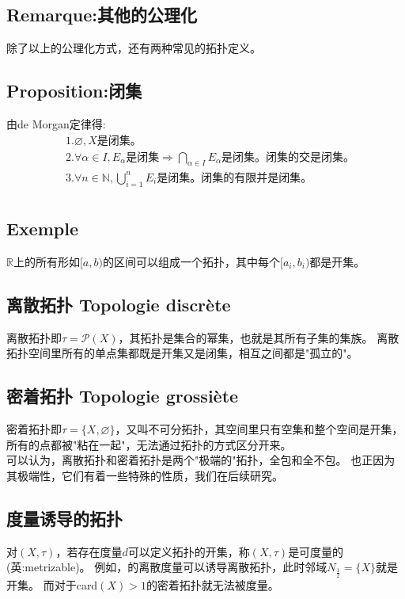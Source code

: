 \documentclass[12pt, a4paper, oneside]{ctexbook}
\begin{document}
  \subsection{Remarque:其他的公理化}
  除了以上的公理化方式，还有两种常见的拓扑定义。
  \subsection{Proposition:闭集}
  由de Morgan定律得:
  $$
  \begin{aligned}&
  1.\varnothing, X{ 是闭集。}\\&
  2.\forall\alpha\in I,E_\alpha\text{是闭集} \Rightarrow\bigcap_{\alpha\in I}E_\alpha \text{是闭集。闭集的交是闭集。}\\&
  3.\forall n\in\mathbb{N},\bigcup_{i=1}^{n}E_i \text{是闭集。闭集的有限并是闭集。}\\
    \end{aligned}
  $$
  \subsection{Exemple}
  $\mathbb{R}$上的所有形如$[a,b)$的区间可以组成一个拓扑，其中每个$[a_i,b_i)$都是开集。

  \subsection{离散拓扑 Topologie discrète}
  离散拓扑即$\tau=\mathcal{P} (X)$，其拓扑是集合的幂集，也就是其所有子集的集族。
  离散拓扑空间里所有的单点集都既是开集又是闭集，相互之间都是"孤立的"。

  \subsection{密着拓扑 Topologie grossiète}
  密着拓扑即$\tau=\{X,\varnothing \}$，又叫不可分拓扑，其空间里只有空集和整个空间是开集，所有的点都被"粘在一起"，无法通过拓扑的方式区分开来。\\
  
  可以认为，离散拓扑和密着拓扑是两个"极端的"拓扑，全包和全不包。
  也正因为其极端性，它们有着一些特殊的性质，我们在后续研究。
  
  \subsection{度量诱导的拓扑}
  对$(X,\tau)$，若存在度量$d$可以定义拓扑的开集，称$(X,\tau)$是可度量的(英:metrizable)。
  例如，的离散度量可以诱导离散拓扑，此时邻域$N_\frac{1}{2}=\{X\}$就是开集。
  而对于card$(X)>1$的密着拓扑就无法被度量。
\end{document}
